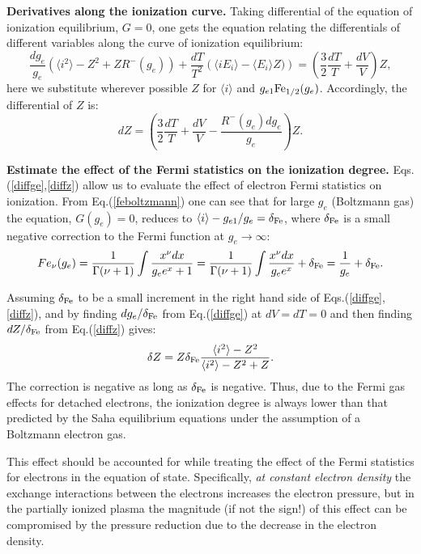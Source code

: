{\bf Derivatives along the ionization curve.}
Taking differential of the equation of ionization equilibrium, $G=0$, one gets the equation relating the differentials
of different variables along the curve of ionization equilibrium:
\begin{equation}\label{diffge}
\frac{dg_e}
{g_e}
\left(
\langle i^2\rangle-Z^2+ZR^-(g_e)
\right)+\frac{dT}{T^2}
\left(\langle iE_i\rangle-\langle E_i\rangle Z)\right)=\left(\frac32\frac{dT}{T}+\frac{dV}V\right)Z,
\end{equation}
here we substitute wherever possible $Z$ for $\langle i\rangle$ and $g_{e1}{\rm Fe}_{1/2}(g_e)$.
Accordingly, the differential of $Z$ is:
\begin{equation}\label{diffz}
dZ=\left(\frac32\frac{dT}{T}+\frac{dV}V-\frac{R^-(g_e)dg_e}{g_e}\right)Z.
\end{equation}

{\bf Estimate the effect of the Fermi statistics on the ionization degree.}
Eqs.(\ref{diffge},\ref{diffz}) allow us to evaluate the effect of electron Fermi statistics on ionization.
From Eq.(\ref{feboltzmann}) one can
see that for large $g_e$ (Boltzmann gas) the equation, $G(g_e)=0$, reduces to $\langle i\rangle-g_{e1}/g_e=\delta_{\rm Fe}$,
where $\delta_{\rm Fe}$ is a small negative correction to the Fermi function at $g_e \to \infty$:
\begin{equation}\label{feboltzmann}
Fe_\nu(g_e)=\frac{1}{\Gamma(\nu+1)} \int \frac{x^\nu dx}{g_e e^x + 1} =
\frac{1}{\Gamma(\nu+1)} \int \frac{x^\nu dx}{g_e e^x} + \delta_{\rm Fe} = \frac{1}{g_e} + \delta_{\rm Fe}.
\end{equation}

Assuming $\delta_{\rm Fe}$ to be a small increment in the right hand side of Eqs.(\ref{diffge},\ref{diffz}), and by
finding $dg_e/\delta_{\rm Fe}$ from Eq.(\ref{diffge}) at $dV=dT=0$ and then finding $dZ/\delta_{\rm Fe}$ from Eq.(\ref{diffz}) gives:
\begin{equation}
\delta Z=Z\delta_{\rm Fe}\frac{\langle i^2\rangle-Z^2}{\langle i^2\rangle-Z^2+Z}. 
\end{equation}
The correction is negative as long as $\delta_{\rm Fe}$ is negative. Thus, due to the Fermi gas effects for detached electrons, the ionization degree is
always lower than that predicted by the Saha equilibrium equations under the assumption of a Boltzmann electron gas.

This effect should be accounted for while
treating the effect of the Fermi statistics for electrons in the equation of state. Specifically, {\it at constant electron density} the exchange interactions 
between the electrons increases the electron pressure, but in the partially ionized plasma the magnitude (if not the sign!) of this effect can be  
compromised by the pressure reduction due to the decrease in the electron density. 

